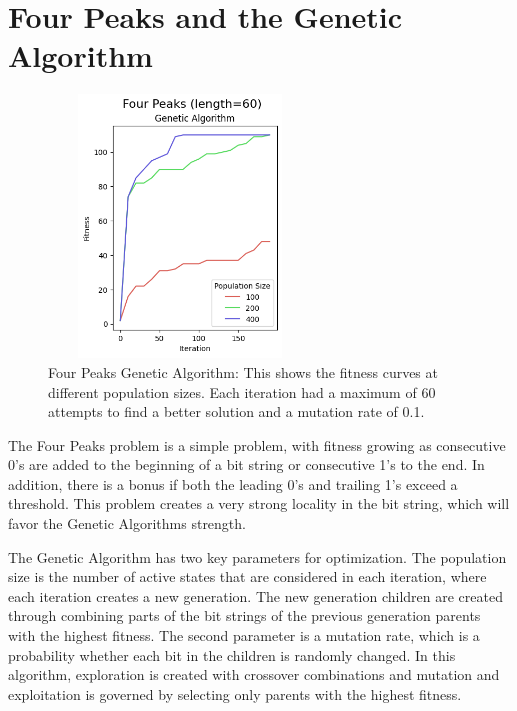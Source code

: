\documentclass[letterpaper]{article} %
\begin{document}
\section{Four Peaks and the Genetic Algorithm}
\begin{figure}[!htb]
\centering
\includegraphics[width=2.75in, height=2.75in]{figures/Four_Peaks_length=60_Genetic_Algorithm_l_60_ma_60_p_100__200__400_mu_0.1_.png}
\caption{Four Peaks Genetic Algorithm:  This shows the fitness curves at different population sizes. Each iteration had a maximum of 60 attempts to find a better solution and a mutation rate of 0.1. }
\label{fig:four_peaks_ga}
\end{figure}

The Four Peaks problem is a simple problem, with fitness growing as consecutive 0's are added to the beginning of a bit string or consecutive 1's to the end.  In addition, there is a bonus if both the leading 0's and trailing 1's exceed a threshold.  This problem creates a very strong locality in the bit string, which will favor the Genetic Algorithms strength.  

The Genetic Algorithm has two key parameters for optimization.  The population size is the number of active states that are considered in each iteration, where each iteration creates a new generation.  The new generation children are  created through combining parts of the bit strings of the previous generation parents with the highest fitness.  The second parameter is a mutation rate, which is a probability whether each bit in the children is randomly changed.  In this algorithm, exploration is created with crossover combinations and mutation and exploitation is governed by selecting only parents with the highest fitness.
\end{document}
